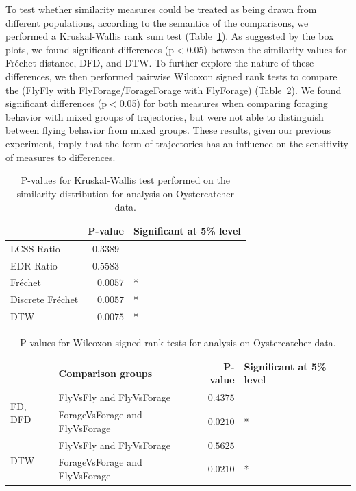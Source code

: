 \documentclass[10pt,letterpaper]{article}
\begin{document}
To test whether similarity measures could be treated as being drawn from different populations, according to the semantics of the comparisons, we performed a Kruskal-Wallis rank sum test (Table~\ref{tab:kruskal_wallis}). As suggested by the box plots, we found significant differences (p$<$0.05) between the similarity values for Fréchet distance, DFD, and DTW. To further explore the nature of these differences, we then performed pairwise Wilcoxon signed rank tests to compare the (FlyFly with FlyForage/ForageForage with FlyForage) (Table~\ref{tab:wilcoxon_oyster}). We found significant differences (p$<$0.05) for both measures when comparing foraging behavior with mixed groups of trajectories, but were not able to distinguish between flying behavior from mixed groups. These results, given our previous experiment, imply that the form of trajectories has an influence on the sensitivity of measures to differences.

\begin{table}[ht]
	\centering
	\caption{P-values for Kruskal-Wallis test performed on the similarity distribution for analysis on Oystercatcher data.}
	\begin{tabular}{l|rl}
		& P-value& Significant at 5\% level\\ \hline
		LCSS Ratio & $0.3389$\  \\
		\rowcolor{gray!15} EDR Ratio & $0.5583$\ & \\
		Fréchet & $0.0057$ & * \\
		\rowcolor{gray!15} Discrete Fréchet & $0.0057$ & * \\
		DTW & $0.0075$ &* \\
	\end{tabular}
	\label{tab:kruskal_wallis}
\end{table}

\begin{table}[ht]
	\centering
	\caption{P-values for Wilcoxon signed rank tests for analysis on Oystercatcher data.}
	\begin{tabular}{l|lrl}
		& Comparison groups & P-value& Significant at 5\% level\\ \hline
		\multirow{2}{*}{FD, DFD} & {FlyVsFly and FlyVsForage} & $0.4375$ & \\ 
		&  {ForageVsForage and FlyVsForage} & $0.0210$ & *\\ \hline
		\multirow{2}{*}{DTW} & {FlyVsFly and FlyVsForage} & $0.5625$ & \\ 	
		& {ForageVsForage and FlyVsForage} & $0.0210$ & *\\ 	
	\end{tabular}
	\label{tab:wilcoxon_oyster}
\end{table}
\end{document}
